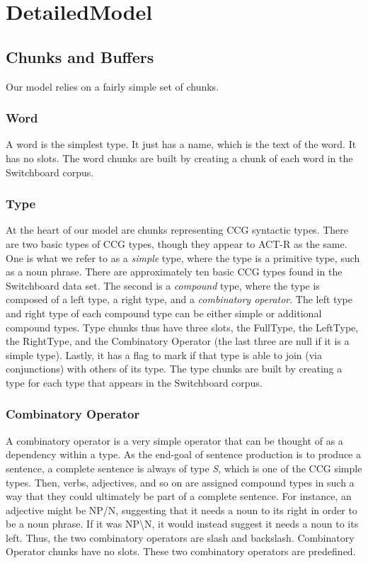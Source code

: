 \section{DetailedModel}
\subsection{Chunks and Buffers}
Our model relies on a fairly simple set of chunks. 

\subsubsection{Word}
A word is the simplest type. It just has a name, which is the text of the word. It has no slots. The word chunks are built by creating a chunk of each word in the Switchboard corpus.

\subsubsection{Type}
At the heart of our model are chunks representing CCG syntactic types. There are two basic types of CCG types, though they appear to ACT-R as the same. One is what we refer to as a \textit{simple} type, where the type is a primitive type, such as a noun phrase. There are approximately ten basic CCG types found in the Switchboard data set. The second is a \textit{compound} type, where the type is composed of a left type, a right type, and a \textit{combinatory operator}. The left type and right type of each compound type can be either simple or additional compound types. Type chunks thus have three slots, the FullType, the LeftType, the RightType, and the Combinatory Operator (the last three are null if it is a simple type). Lastly, it has a flag to mark if that type is able to join (via conjunctions) with others of its type. The type chunks are built by creating a type for each type that appears in the Switchboard corpus.

\subsubsection{Combinatory Operator}
A combinatory operator is a very simple operator that can be thought of as a dependency within a type. As the end-goal of sentence production is to produce a sentence, a complete sentence is always of type \textit{S}, which is one of the CCG simple types. Then, verbs, adjectives, and so on are assigned compound types in such a way that they could ultimately be part of a complete sentence. For instance, an adjective might be NP/N, suggesting that it needs a noun to its right in order to be a noun phrase. If it was NP\textbackslash N, it would instead suggest it needs a noun to its left. Thus, the two combinatory operators are slash and backslash. Combinatory Operator chunks have no slots. These two combinatory operators are predefined.

